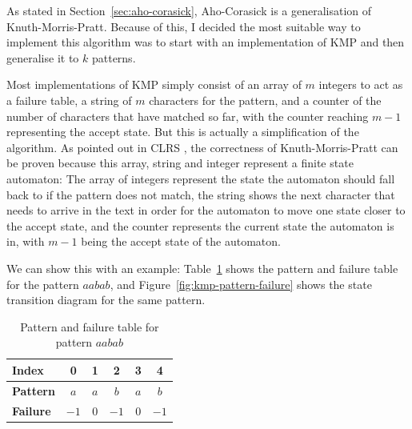 \documentclass[ %
                    author={Dominic Joseph Moylett},
                    degree={MEng},
                     title={Dictionary Matching with Fingerprints},
                  subtitle={An Empirical Analysis},
                      type={research},
                      year={2015} ]{dissertation}
\begin{document}
As stated in Section~\ref{sec:aho-corasick}, Aho-Corasick \cite{Aho:1975:ESM:360825.360855} is a generalisation of Knuth-Morris-Pratt. Because of this, I decided the most suitable way to implement this algorithm was to start with an implementation of KMP and then generalise it to $k$ patterns.

Most implementations of KMP simply consist of an array of $m$ integers to act as a failure table, a string of $m$ characters for the pattern, and a counter of the number of characters that have matched so far, with the counter reaching $m - 1$ representing the accept state. But this is actually a simplification of the algorithm. As pointed out in CLRS \cite[pp 1002-1011]{clrs}, the correctness of Knuth-Morris-Pratt can be proven because this array, string and integer represent a finite state automaton: The array of integers represent the state the automaton should fall back to if the pattern does not match, the string shows the next character that needs to arrive in the text in order for the automaton to move one state closer to the accept state, and the counter represents the current state the automaton is in, with $m - 1$ being the accept state of the automaton.

We can show this with an example: Table~\ref{tab:kmp-pattern-failure} shows the pattern and failure table for the pattern $aabab$, and Figure~\ref{fig:kmp-pattern-failure} shows the state transition diagram for the same pattern.

\begin{table}[t]
  \centering
  \begin{tabular}{|l|c|c|c|c|c|}
    \hline
    \textbf{Index} & 0 & 1 & 2 & 3 & 4 \\\hline
    \textbf{Pattern} & $a$ & $a$ & $b$ & $a$ & $b$ \\\hline
    \textbf{Failure} & $-1$ & 0 & $-1$ & 0 & $-1$\\\hline
  \end{tabular}
  \caption{Pattern and failure table for pattern $aabab$}
  \label{tab:kmp-pattern-failure}
\end{table}
\end{document}

